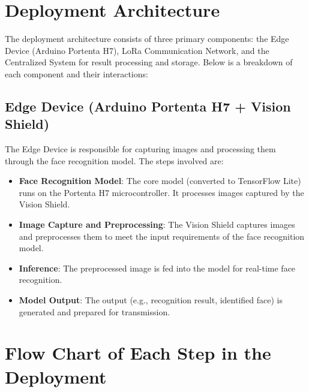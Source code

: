 \section{Deployment Architecture}

The deployment architecture consists of three primary components: the Edge Device (Arduino Portenta H7), LoRa Communication Network, and the Centralized System for result processing and storage. Below is a breakdown of each component and their interactions:

\subsection{Edge Device (Arduino Portenta H7 + Vision Shield)}
The Edge Device is responsible for capturing images and processing them through the face recognition model. The steps involved are:

\begin{itemize}
	\item \textbf{Face Recognition Model}: The core model (converted to TensorFlow Lite) runs on the Portenta H7 microcontroller. It processes images captured by the Vision Shield.
	\item \textbf{Image Capture and Preprocessing}: The Vision Shield captures images and preprocesses them to meet the input requirements of the face recognition model.
	\item \textbf{Inference}: The preprocessed image is fed into the model for real-time face recognition.
	\item \textbf{Model Output}: The output (e.g., recognition result, identified face) is generated and prepared for transmission.
\end{itemize}


\section{Flow Chart of Each Step in the Deployment}

